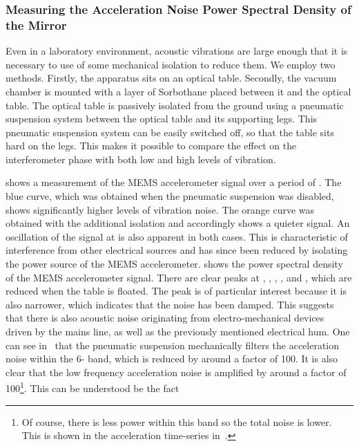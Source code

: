 \subsubsection{Measuring the Acceleration Noise Power Spectral Density
of the Mirror}
Even in a laboratory environment, acoustic
vibrations are large enough that it is necessary to use of some
mechanical isolation to reduce them.
We employ two methods. Firstly, the apparatus sits on an optical
table. Secondly, the vacuum
chamber is mounted with a layer of Sorbothane placed between it and the optical
table. The optical table is passively isolated
from the ground using a pneumatic suspension system between the optical table and its
supporting legs. This pneumatic suspension system can be easily
switched off, so that the table sits hard on the legs. This makes it possible to compare the effect on the
interferometer phase 
with both low and high levels of vibration.
\par\noindent
{} shows a measurement of the MEMS
accelerometer signal over a period of . The blue curve,
which was obtained when the pneumatic suspension was disabled, shows
significantly higher levels of vibration noise. The orange curve was
obtained with the additional isolation and accordingly shows a quieter
signal. An oscillation of the
signal at  is also apparent in both cases. This is
characteristic of interference from other electrical sources and has
since been reduced by isolating the power source of the MEMS
accelerometer. 
shows the power spectral density of the MEMS accelerometer signal.
There are clear peaks at , ,
, ,  and
, which are reduced when the table is floated. The
 peak is of particular interest because it is also
narrower, which indicates that the noise has been damped. This
suggests that there is also acoustic noise originating from electro-mechanical devices
driven by the  mains line, as well as the previously
mentioned electrical hum. 
One can see in~ that the pneumatic suspension mechanically filters the acceleration noise within the 6-
band, which is reduced by around a factor of 100. It is also clear that the low frequency
acceleration noise is amplified by around a factor of 100\footnote{Of
  course, there is less power within this band so the total noise is
  lower. This is shown in the acceleration time-series
in~.}. This can be understood be the fact
